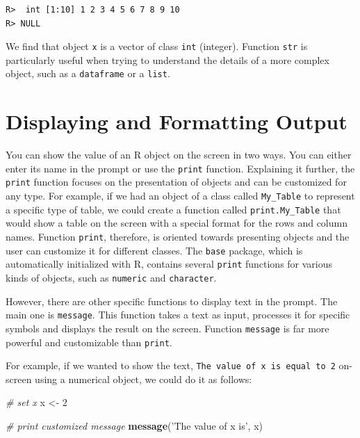\documentclass[
  12pt,
]{book}
\newenvironment{Shaded}{\begin{snugshade}}{\end{snugshade}}
\newcommand{\CommentTok}[1]{\textcolor[rgb]{0.37,0.37,0.37}{\textit{#1}}}
\newcommand{\DecValTok}[1]{\textcolor[rgb]{0.06,0.06,0.06}{#1}}
\newcommand{\KeywordTok}[1]{\textcolor[rgb]{0.27,0.27,0.27}{\textbf{#1}}}
\newcommand{\NormalTok}[1]{#1}
\newcommand{\StringTok}[1]{\textcolor[rgb]{0.5,0.5,0.5}{#1}}
\begin{document}
\begin{verbatim}
R>  int [1:10] 1 2 3 4 5 6 7 8 9 10
R> NULL
\end{verbatim}

We find that object \texttt{x} is a vector of class \texttt{int} (integer). Function \texttt{str} is particularly useful when trying to understand the details of a more complex object, such as a \texttt{dataframe} or a \texttt{list}.

\hypertarget{displaying-and-formatting-output}{%
\section{Displaying and Formatting Output}\label{displaying-and-formatting-output}}

You can show the value of an R object on the screen in two ways. You can either enter its name in the prompt or use the \texttt{print} function. Explaining it further, the \texttt{print} function focuses on the presentation of objects and can be customized for any type. For example, if we had an object of a class called \texttt{My\_Table} to represent a specific type of table, we could create a function called \texttt{print.My\_Table} that would show a table on the screen with a special format for the rows and column names. Function \texttt{print}, therefore, is oriented towards presenting objects and the user can customize it for different classes. The \texttt{base} package, which is automatically initialized with R, contains several \texttt{print} functions for various kinds of objects, such as \texttt{numeric} and \texttt{character}.

However, there are other specific functions to display text in the prompt. The main one is \texttt{message}. This function takes a text as input, processes it for specific symbols and displays the result on the screen. Function \texttt{message} is far more powerful and customizable than \texttt{print}. 

For example, if we wanted to show the text, \texttt{The\ value\ of\ x\ is\ equal\ to\ 2} on-screen using a numerical object, we could do it as follows:

\begin{Shaded}
\begin{Highlighting}[]
\CommentTok{# set x}
\NormalTok{x <-}\StringTok{ }\DecValTok{2}

\CommentTok{# print customized message}
\KeywordTok{message}\NormalTok{(}\StringTok{'The value of x is'}\NormalTok{, x)}
\end{Highlighting}
\end{Shaded}
\end{document}
